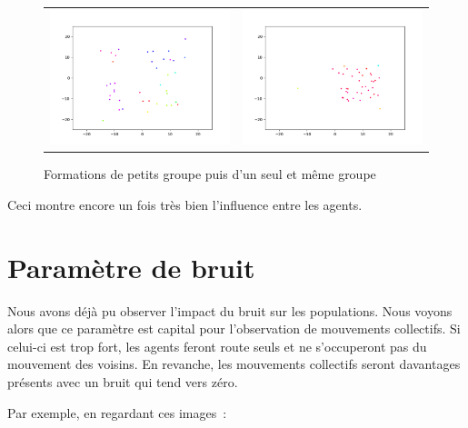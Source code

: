 \documentclass[french, a4paper, 12pt, openany]{report}
\begin{document}
   \begin{figure}[!h]
		\centering
		\begin{tabular}{cc}
			\includegraphics[width=8cm]{images/image_7.png} & \includegraphics[width=8cm]{images/image_9.png} \\
		\end{tabular}
		\caption{Formations de petits groupe puis d'un seul et même groupe}
		\label{mouvement_grp2}
	\end{figure} 
	
	Ceci montre encore un fois très bien l'influence entre les agents.

\section{Paramètre de bruit}
    
   Nous avons déjà pu observer l'impact du bruit sur les populations. Nous voyons alors que ce paramètre est capital pour l'observation de mouvements collectifs. Si celui-ci est trop fort, les agents feront route seuls et ne s'occuperont pas du mouvement des voisins. En revanche, les mouvements collectifs seront davantages présents avec un bruit qui tend vers zéro.

Par exemple, en regardant ces images~:
   
\end{document}
